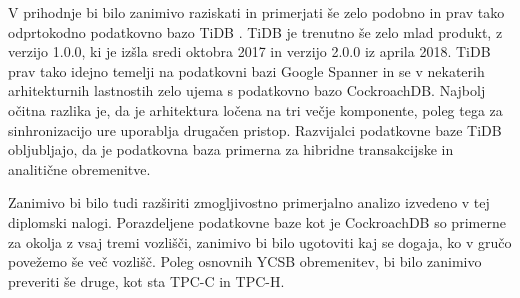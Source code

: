 \documentclass[a4paper, 12pt]{book}
\begin{document}
V prihodnje bi bilo zanimivo raziskati in primerjati še zelo podobno in prav tako odprtokodno podatkovno bazo TiDB \cite{PingCAP-home}. TiDB je trenutno še zelo mlad produkt, z verzijo 1.0.0, ki je izšla sredi oktobra 2017 in verzijo 2.0.0 iz aprila 2018. TiDB prav tako idejno temelji na podatkovni bazi Google Spanner in se v nekaterih arhitekturnih lastnostih zelo ujema s podatkovno bazo CockroachDB. Najbolj očitna razlika je, da je arhitektura ločena na tri večje komponente, poleg tega za sinhronizacijo ure uporablja drugačen pristop. Razvijalci podatkovne baze TiDB obljubljajo, da je podatkovna baza primerna za hibridne transakcijske in analitične obremenitve.

Zanimivo bi bilo tudi razširiti zmogljivostno primerjalno analizo izvedeno v tej diplomski nalogi. Porazdeljene podatkovne baze kot je CockroachDB so primerne za okolja z vsaj tremi vozlišči, zanimivo bi bilo ugotoviti kaj se dogaja, ko v gručo povežemo še več vozlišč. Poleg osnovnih YCSB obremenitev, bi bilo zanimivo preveriti še druge, kot sta TPC-C in TPC-H.


\newpage %
\ \\
\clearpage
{}


\end{document}
